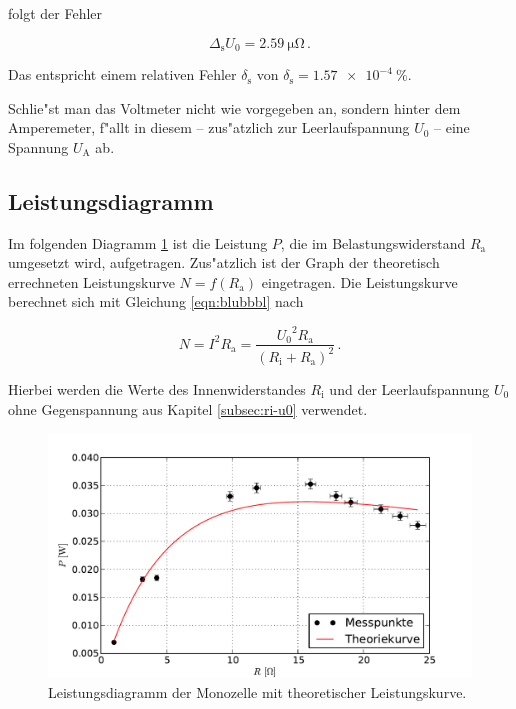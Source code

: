 		folgt der Fehler

		\begin{equation*}
			\Delta_\mathrm{s} U_0 = \SI{2.59}{\micro \ohm} \,.
		\end{equation*}

		Das entspricht einem relativen Fehler $\delta_\mathrm{s}$ von $\delta_\mathrm{s} = \SI{1.57e-4}{\percent}$.

		Schlie"st man das Voltmeter nicht wie vorgegeben an, sondern hinter dem Amperemeter, f"allt in diesem -- zus"atzlich zur Leerlaufspannung $U_0$ -- eine Spannung $U_\mathrm{A}$ ab.

	\subsection{Leistungsdiagramm}
	\label{subsec:leistung}
		Im folgenden Diagramm \ref{fig:graph_monozelle_leistung} ist die Leistung $P$, die im Belastungswiderstand $R_\mathrm{a}$ umgesetzt wird, aufgetragen.
		Zus"atzlich ist der Graph der theoretisch errechneten Leistungskurve $N = f(R_\mathrm{a})$ eingetragen.
		Die Leistungskurve berechnet sich mit Gleichung \eqref{eqn:blubbbl} nach

		\begin{equation*}
			N = I^2 R_\mathrm{a} = \frac{{U_0}^2 R_\mathrm{a}}{\left(R_\mathrm{i} + R_\mathrm{a}\right)^2} \,.
		\end{equation*}

		Hierbei werden die Werte des Innenwiderstandes $R_\mathrm{i}$ und der Leerlaufspannung $U_0$ ohne Gegenspannung aus Kapitel \ref{subsec:ri-u0} verwendet.

		\begin{figure}[h]
			\centering
			\includegraphics[width = 15cm]{img/graph_monozelle_leistung.pdf}
			\caption{Leistungsdiagramm der Monozelle mit theoretischer Leistungskurve. \label{fig:graph_monozelle_leistung}}
		\end{figure}